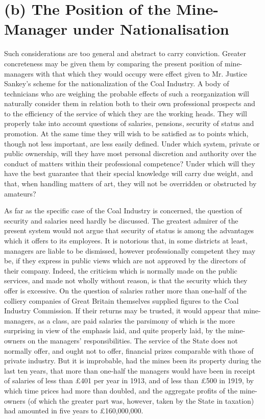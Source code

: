 \documentclass{book}
\begin{document}
\section{(b) The Position of the Mine-Manager under Nationalisation}
Such considerations are too general and abstract to carry conviction. Greater concreteness may be given them by comparing the present position of mine-managers with that which they would occupy were effect given to Mr. Justice Sankey’s scheme for the nationalization of the Coal Industry. A body of technicians who are weighing the probable effects of such a reorganization will naturally consider them in relation both to their own professional prospects and to the efficiency of the service of which they are the working heads. They will properly take into account questions of salaries, pensions, security of status and promotion. At the same time they will wish to be satisfied as to points which, though not less important, are less easily defined. Under which system, private or public ownership, will they have most personal discretion and authority over the conduct of matters within their professional competence? Under which will they have the best guarantee that their special knowledge will carry due weight, and that, when handling matters of art, they will not be overridden or obstructed by amateurs?

As far as the specific case of the Coal Industry is concerned, the question of security and salaries need hardly be discussed. The greatest admirer of the present system would not argue that security of status is among the advantages which it offers to its employees. It is notorious that, in some districts at least, managers are liable to be dismissed, however professionally competent they may be, if they express in public views which are not approved by the directors of their company. Indeed, the criticism which is normally made on the public services, and made not wholly without reason, is that the security which they offer is excessive. On the question of salaries rather more than one-half of the colliery companies of Great Britain themselves supplied figures to the Coal Industry Commission. If their returns may be trusted, it would appear that mine-managers, as a class, are paid salaries the parsimony of which is the more surprising in view of the emphasis laid, and quite properly laid, by the mine-owners on the managers’ responsibilities. The service of the State does not normally offer, and ought not to offer, financial prizes comparable with those of private industry. But it is improbable, had the mines been its property during the last ten years, that more than one-half the managers would have been in receipt of salaries of less than £401 per year in 1913, and of less than £500 in 1919, by which time prices had more than doubled, and the aggregate profits of the mine-owners (of which the greater part was, however, taken by the State in taxation) had amounted in five years to £160,000,000.
\end{document}
